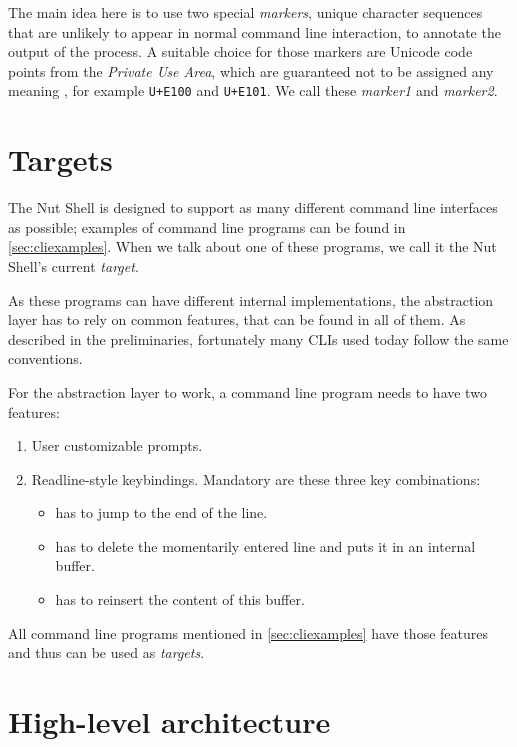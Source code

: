 \documentclass[paper=a4,abstract=on,cleardoublepage=empty,numbers=noenddot,toc=bib,12pt,appendixprefix=true]{scrreprt}
\begin{document}
The main idea here is to use two special \emph{markers}, unique character sequences that are unlikely to appear in normal command line interaction, to annotate the output of the process. A suitable choice for those markers are Unicode code points from the \emph{Private Use Area}, which are guaranteed not to be assigned any meaning \cite[p. 558]{unicode6.2}, for example \texttt{U+E100} and \texttt{U+E101}. We call these \emph{marker1} and \emph{marker2}.

\section{Targets}
\label{sec:targets}

The Nut Shell is designed to support as many different command line interfaces as possible; examples of command line programs can be found in \cref{sec:cliexamples}. When we talk about one of these programs, we call it the Nut Shell's current \emph{target}.

As these programs can have different internal implementations, the abstraction layer has to rely on common features, that can be found in all of them. As described in the preliminaries, fortunately many \textsc{CLI}s used today follow the same conventions.

For the abstraction layer to work, a command line program needs to have two features:

\begin{enumerate}
    \item User customizable prompts.
    \item Readline-style keybindings. Mandatory are these three key combinations:
        \begin{itemize}
            \item {} has to jump to the end of the line.
            \item {} has to delete the momentarily entered line and puts it in an internal buffer.
            \item {} has to reinsert the content of this buffer.
        \end{itemize}
\end{enumerate}

All command line programs mentioned in \cref{sec:cliexamples} have those features and thus can be used as \emph{targets}.

\section{High-level architecture}
\end{document}

